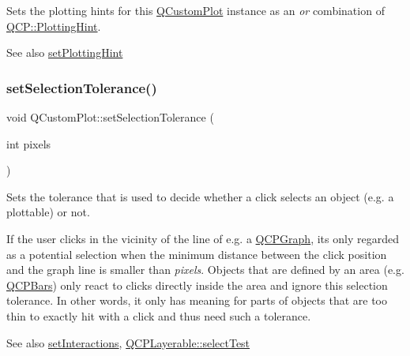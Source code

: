 Sets the plotting hints for this \hyperlink{class_q_custom_plot}{Q\+Custom\+Plot} instance as an {\itshape or} combination of \hyperlink{namespace_q_c_p_a5400e5fcb9528d92002ddb938c1f4ef4}{Q\+C\+P\+::\+Plotting\+Hint}.

\begin{DoxySeeAlso}{See also}
\hyperlink{class_q_custom_plot_a3b7c97bb6c16464e9e15190c07abe9a9}{set\+Plotting\+Hint} 
\end{DoxySeeAlso}
\hypertarget{class_q_custom_plot_a4dc31241d7b09680950e19e5f971ed93}{}\label{class_q_custom_plot_a4dc31241d7b09680950e19e5f971ed93} 
\subsubsection{\texorpdfstring{set\+Selection\+Tolerance()}{setSelectionTolerance()}}
{\footnotesize\ttfamily void Q\+Custom\+Plot\+::set\+Selection\+Tolerance (\begin{DoxyParamCaption}\item[{int}]{pixels }\end{DoxyParamCaption})}

Sets the tolerance that is used to decide whether a click selects an object (e.\+g. a plottable) or not.

If the user clicks in the vicinity of the line of e.\+g. a \hyperlink{class_q_c_p_graph}{Q\+C\+P\+Graph}, it\textquotesingle{}s only regarded as a potential selection when the minimum distance between the click position and the graph line is smaller than {\itshape pixels}. Objects that are defined by an area (e.\+g. \hyperlink{class_q_c_p_bars}{Q\+C\+P\+Bars}) only react to clicks directly inside the area and ignore this selection tolerance. In other words, it only has meaning for parts of objects that are too thin to exactly hit with a click and thus need such a tolerance.

\begin{DoxySeeAlso}{See also}
\hyperlink{class_q_custom_plot_a5ee1e2f6ae27419deca53e75907c27e5}{set\+Interactions}, \hyperlink{class_q_c_p_layerable_a04db8351fefd44cfdb77958e75c6288e}{Q\+C\+P\+Layerable\+::select\+Test} 
\end{DoxySeeAlso}
\hypertarget{class_q_custom_plot_a3f9bc4b939dd8aaba9339fd09f273fc4}{}\label{class_q_custom_plot_a3f9bc4b939dd8aaba9339fd09f273fc4} 
